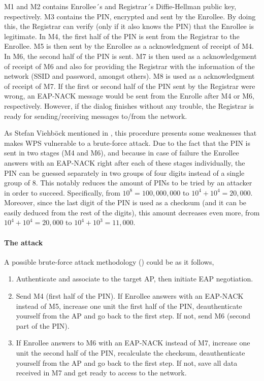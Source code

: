 \documentclass[a4paper,11pt]{article}
\begin{document}
M1 and M2 contains Enrollee´s and Registrar´s Diffie-Hellman public key, respectively. M3 contains the PIN, encrypted and sent by the Enrollee. By doing this, the Registrar can verify (only if it also knows the PIN) that the Enrollee is legitimate. In M4, the first half of the PIN is sent from the Registrar to the Enrollee. M5 is then sent by the Enrollee as a acknowledgment of receipt of M4. In M6, the second half of the PIN is sent. M7 is then used as a acknowledgement of receipt of M6 and also for providing the Registrar with the information of the network (SSID and password, amongst others). M8 is used as a acknowledgment of receipt of M7. If the first or second half of the PIN sent by the Registrar were wrong, an EAP-NACK message would be sent from the Enrolle after M4 or M6, respectively. However, if the dialog finishes without any trouble, the Registrar is ready for sending/receiving messages to/from the network.

As Stefan Viehb\"{o}ck mentioned in \cite{stefan}, this procedure presents some weaknesses that makes WPS vulnerable to a brute-force attack. Due to the fact that the PIN is sent in two stages (M4 and M6), and because in case of failure the Enrollee answers with an EAP-NACK right after each of these stages individually, the PIN can be guessed separately in two groups of four digits instead of a single group of 8. This notably reduces the amount of PINs to be tried by an attacker in order to succeed. Specifically, from $10^8=100,000,000$ to $10^4+10^4=20,000$. Moreover, since the last digit of the PIN is used as a checksum (and it can be easily deduced from the rest of the digits), this amount decreases even more, from $10^4+10^4=20,000$ to $10^4+10^3=11,000$.

\paragraph{The attack}
A possible brute-force attack methodology (\cite{stefan,reaver}) could be as it follows,
\begin{enumerate}
\item Authenticate and associate to the target AP, then initiate EAP negotiation.
\item Send M4 (first half of the PIN). If Enrollee answers with an EAP-NACK instead of M5, increase one unit the first half of the PIN, deauthenticate yourself from the AP and go back to the first step. If not, send M6 (second part of the PIN).
\item If Enrollee answers to M6 with an EAP-NACK instead of M7, increase one unit the second half of the PIN, recalculate the checksum, deauthenticate yourself from the AP and go back to the first step. If not, save all data received in M7 and get ready to access to the network.
\end{enumerate}
\end{document}
